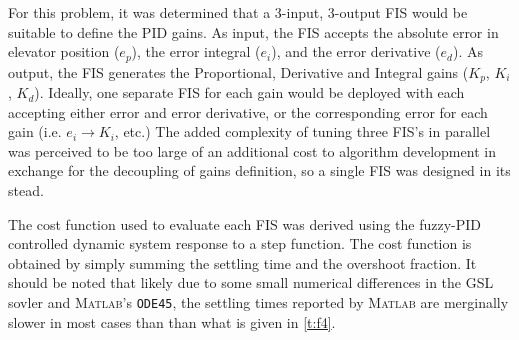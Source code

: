 \documentclass[12pt]{article}
\begin{document}
For this problem, it was determined that a 3-input, 3-output FIS would be suitable to define the PID gains. As input, the FIS accepts the absolute error in elevator position ($e_p$), the error integral ($e_i$), and the error derivative ($e_d$). As output, the FIS generates the Proportional, Derivative and Integral gains ($K_p$, $K_i$, $K_d$). Ideally, one separate FIS for each gain would be deployed with each accepting either error and error derivative, or the corresponding error for each gain (i.e. $e_i\rightarrow K_i$, etc.) The added complexity of tuning three FIS's in parallel was perceived to be too large of an additional cost to algorithm development in exchange for the decoupling of gains definition, so a single FIS was designed in its stead. 

The cost function used to evaluate each FIS was derived using the fuzzy-PID controlled dynamic system response to a step function. The cost function is obtained by simply summing the settling time and the overshoot fraction. It should be noted that likely due to some small numerical differences in the GSL sovler and \textsc{Matlab}'s \verb|ODE45|, the settling times reported by \textsc{Matlab} are merginally slower in most cases than than what is given in \cref{t:f4}.
\end{document}
